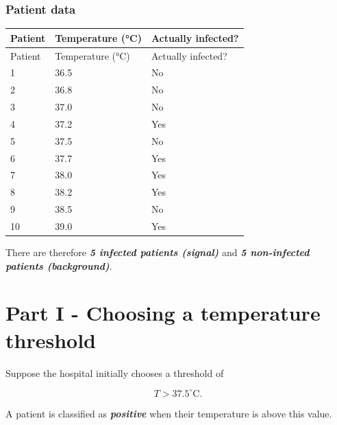 \documentclass[10pt]{article}
\begin{document}
\subsubsection*{Patient data}
\begingroup
\small
\setlength{\tabcolsep}{4pt}
\begin{longtable}{l|l|l}
Patient & Temperature (°C) & Actually infected? \\[1.5pt]
\hline
\endfirsthead
Patient & Temperature (°C) & Actually infected? \\[1.5pt]
\hline
\endhead
1 & 36.5 & No \\[1.5pt]
2 & 36.8 & No \\[1.5pt]
3 & 37.0 & No \\[1.5pt]
4 & 37.2 & Yes \\[1.5pt]
5 & 37.5 & No \\[1.5pt]
6 & 37.7 & Yes \\[1.5pt]
7 & 38.0 & Yes \\[1.5pt]
8 & 38.2 & Yes \\[1.5pt]
9 & 38.5 & No \\[1.5pt]
10 & 39.0 & Yes \\[1.5pt]
\end{longtable}
\endgroup
There are therefore \textbf{\textit{5 infected patients (signal)}} and \textbf{\textit{5 non-infected patients (background)}}.

\clearpage
\section*{Part I - Choosing a temperature threshold}
Suppose the hospital initially chooses a threshold of

\[
T > 37.5^\circ\mathrm{C}.
\]

A patient is classified as \textbf{\textit{positive}} when their temperature is above this value.
\end{document}
